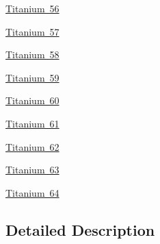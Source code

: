 \begin{DoxyCompactItemize}
\item 
\mbox{\hyperlink{group___isotope_const-_titanium-_ti56}{Titanium 56}}
\item 
\mbox{\hyperlink{group___isotope_const-_titanium-_ti57}{Titanium 57}}
\item 
\mbox{\hyperlink{group___isotope_const-_titanium-_ti58}{Titanium 58}}
\item 
\mbox{\hyperlink{group___isotope_const-_titanium-_ti59}{Titanium 59}}
\item 
\mbox{\hyperlink{group___isotope_const-_titanium-_ti60}{Titanium 60}}
\item 
\mbox{\hyperlink{group___isotope_const-_titanium-_ti61}{Titanium 61}}
\item 
\mbox{\hyperlink{group___isotope_const-_titanium-_ti62}{Titanium 62}}
\item 
\mbox{\hyperlink{group___isotope_const-_titanium-_ti63}{Titanium 63}}
\item 
\mbox{\hyperlink{group___isotope_const-_titanium-_ti64}{Titanium 64}}
\end{DoxyCompactItemize}


\subsection{Detailed Description}
